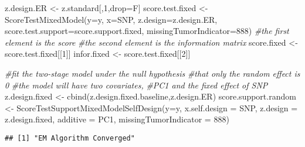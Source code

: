 \documentclass[11pt,]{article}
\newenvironment{Shaded}{\begin{snugshade}}{\end{snugshade}}
\newcommand{\AttributeTok}[1]{\textcolor[rgb]{0.77,0.63,0.00}{#1}}
\newcommand{\CommentTok}[1]{\textcolor[rgb]{0.56,0.35,0.01}{\textit{#1}}}
\newcommand{\DecValTok}[1]{\textcolor[rgb]{0.00,0.00,0.81}{#1}}
\newcommand{\FunctionTok}[1]{\textcolor[rgb]{0.00,0.00,0.00}{#1}}
\newcommand{\NormalTok}[1]{#1}
\newcommand{\OtherTok}[1]{\textcolor[rgb]{0.56,0.35,0.01}{#1}}
\begin{document}
\begin{Shaded}
\begin{Highlighting}[]
\NormalTok{z.design.ER }\OtherTok{\textless{}{-}}\NormalTok{ z.standard[,}\DecValTok{1}\NormalTok{,drop}\OtherTok{=}\NormalTok{F]}
\NormalTok{score.test.fixed }\OtherTok{\textless{}{-}} \FunctionTok{ScoreTestMixedModel}\NormalTok{(}\AttributeTok{y=}\NormalTok{y,}
                    \AttributeTok{x=}\NormalTok{SNP,}
                    \AttributeTok{z.design=}\NormalTok{z.design.ER,}
                    \AttributeTok{score.test.support=}\NormalTok{score.support.fixed,}
                    \AttributeTok{missingTumorIndicator=}\DecValTok{888}\NormalTok{)}
\CommentTok{\#the first element is the score}
\CommentTok{\#the second element is the information matrix}
\NormalTok{score.fixed }\OtherTok{\textless{}{-}}\NormalTok{ score.test.fixed[[}\DecValTok{1}\NormalTok{]]}
\NormalTok{infor.fixed }\OtherTok{\textless{}{-}}\NormalTok{ score.test.fixed[[}\DecValTok{2}\NormalTok{]]}

\CommentTok{\#fit the two{-}stage model under the null hypothesis}
\CommentTok{\#that only the random effect is 0}
\CommentTok{\#the model will have two covariates, }
\CommentTok{\#PC1 and the fixed effect of SNP}
\NormalTok{z.design.fixed }\OtherTok{\textless{}{-}} \FunctionTok{cbind}\NormalTok{(z.design.fixed.baseline,z.design.ER)}
\NormalTok{score.support.random }\OtherTok{\textless{}{-}} \FunctionTok{ScoreTestSupportMixedModelSelfDesign}\NormalTok{(}\AttributeTok{y=}\NormalTok{y,}
                        \AttributeTok{x.self.design  =}\NormalTok{ SNP,}
                        \AttributeTok{z.design =}\NormalTok{ z.design.fixed,}
                        \AttributeTok{additive =}\NormalTok{ PC1,}
                        \AttributeTok{missingTumorIndicator =} \DecValTok{888}\NormalTok{)}
\end{Highlighting}
\end{Shaded}

\begin{verbatim}
## [1] "EM Algorithm Converged"
\end{verbatim}
\end{document}
